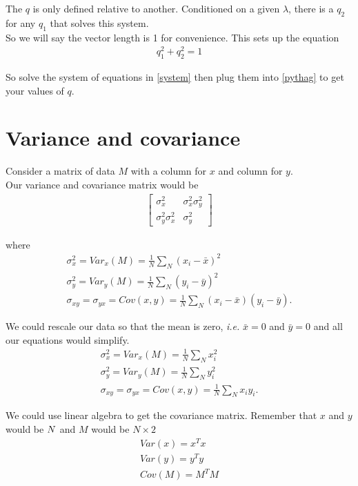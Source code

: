 \documentclass{article}
\begin{document}
The $q$ is only defined relative to another. Conditioned on a given $\lambda$, there is a $q_2$ for any $q_1$ that solves this system. \\

So we will say the vector length is 1 for convenience. This sets up the equation 
\begin{align}
    q_1^2 + q_2^2 = 1 \label{pythag}
\end{align}

So solve the system of equations in \ref{system} then plug them into \ref{pythag} to get your values of $q$. 

\section{Variance and covariance}

Consider a matrix of data $M$ with a column for $x$ and column for $y$. \\

Our variance and covariance matrix would be 
\begin{align}
    \begin{bmatrix}
        \sigma_x^2 & \sigma_x^2 \sigma_y^2\\
        \sigma_y^2\sigma_x^2 & \sigma_y^2
    \end{bmatrix}
\end{align}

where 
\begin{align}
    \sigma_x^2 = Var_x(M) = \frac{1}{N} \sum_N (x_i - \bar x) ^2\\
    \sigma_y^2 = Var_y(M) = \frac{1}{N} \sum_N (y_i - \bar y) ^2\\
    \sigma_{xy} = \sigma_{yx} = Cov(x,y) = \frac{1}{N} \sum_N (x_i - \bar x)(y_i - \bar y).
\end{align}

We could rescale our data so that the mean is zero, \textit{i.e.} $\bar x = 0$ and $\bar y = 0 $ and all our equations would simplify. 
\begin{align}
    \sigma_x^2 = Var_x(M) = \frac{1}{N} \sum_N x_i ^2\\
    \sigma_y^2 = Var_y(M) = \frac{1}{N} \sum_N y_i ^2\\
    \sigma_{xy} = \sigma_{yx} = Cov(x,y) = \frac{1}{N} \sum_N x_i y_i.
\end{align}

We could use linear algebra to get the covariance matrix. Remember that $x$ and $y$ would be $N \time 1$ and $M$ would be $N \times 2$
\begin{align}
    Var(x) = x^T x \\
    Var(y) = y^T y\\
    Cov(M) = M^T M
\end{align}
\end{document}
